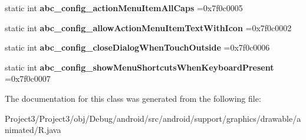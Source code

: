 \begin{DoxyCompactItemize}
static int {\bfseries abc\+\_\+config\+\_\+action\+Menu\+Item\+All\+Caps} =0x7f0c0005
\item 
\mbox{\label{classandroid_1_1support_1_1graphics_1_1drawable_1_1animated_1_1R_1_1bool_a1f3bf6186fcae9abf0cb081a11512885}} 
static int {\bfseries abc\+\_\+config\+\_\+allow\+Action\+Menu\+Item\+Text\+With\+Icon} =0x7f0c0002
\item 
\mbox{\label{classandroid_1_1support_1_1graphics_1_1drawable_1_1animated_1_1R_1_1bool_a9233d7e4c03fc0e81a2b6aecb8e07243}} 
static int {\bfseries abc\+\_\+config\+\_\+close\+Dialog\+When\+Touch\+Outside} =0x7f0c0006
\item 
\mbox{\label{classandroid_1_1support_1_1graphics_1_1drawable_1_1animated_1_1R_1_1bool_a0386bdcaec6bb7d2c9eab979c73b6132}} 
static int {\bfseries abc\+\_\+config\+\_\+show\+Menu\+Shortcuts\+When\+Keyboard\+Present} =0x7f0c0007
\end{DoxyCompactItemize}


The documentation for this class was generated from the following file\+:\begin{DoxyCompactItemize}
\item 
Project3/\+Project3/obj/\+Debug/android/src/android/support/graphics/drawable/animated/R.\+java\end{DoxyCompactItemize}
